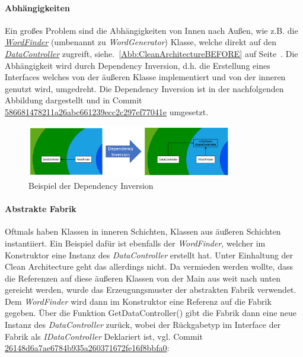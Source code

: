 \paragraph{Abhängigkeiten}
Ein großes Problem sind die Abhängigkeiten von Innen nach Außen, wie z.B. die \href{https://github.com/EinToni/Wortfinder/blob/main/Wortfinder/WordGenerator.cs}{\textit{WordFinder}} (umbenannt zu \textit{WordGenerator}) Klasse, welche direkt auf den \href{https://github.com/EinToni/Wortfinder/blob/586681478211a26abc661239ecc2c297ef77041e/Wortfinder/DataController.cs}{\textit{DataController}} zugreift, siehe.~\ref{Abb:CleanArchitectureBEFORE} auf Seite~\pageref{Abb:CleanArchitectureBEFORE}. Die Abhängigkeit wird durch Dependency Inversion, d.h. die Erstellung eines Interfaces welches von der äußeren Klasse implementiert und von der inneren genutzt wird, umgedreht. Die Dependency Inversion ist in der nachfolgenden Abbildung dargestellt und in Commit \href{https://github.com/EinToni/Wortfinder/commit/586681478211a26abc661239ecc2c297ef77041e}{586681478211a26abc661239ecc2c297ef77041e} umgesetzt.
\newpage
\begin{figure}[!ht]
  \centering
  \includegraphics[width=0.8\textwidth]{Bilder/DependencyInversion.PNG}
  \caption{Beispiel der Dependency Inversion}
  \label{Abb:DependencyInversion}
\end{figure}

\paragraph{Abstrakte Fabrik}
Oftmals haben Klassen in inneren Schichten, Klassen aus äußeren Schichten instantiiert. Ein Beispiel dafür ist ebenfalls der  \textit{WordFinder}, welcher im Konstruktor eine Instanz des \textit{DataController} erstellt hat. Unter Einhaltung der Clean Architecture geht das allerdings nicht. Da vermieden werden wollte, dass die Referenzen auf diese äußeren Klassen von der Main aus weit \glqq nach unten gereicht\grqq{} werden, wurde das Erzeugungsmuster der abstrakten Fabrik verwendet. Dem \textit{WordFinder} wird dann im Konstruktor eine Referenz auf die Fabrik gegeben. Über die Funktion \glqq GetDataController()\grqq{} gibt die Fabrik dann eine neue Instanz des \textit{DataController} zurück, wobei der Rückgabetyp im Interface der Fabrik als \textit{IDataController} Deklariert ist, vgl. Commit \href{https://github.com/EinToni/Wortfinder/commit/26148d6a7ae6784b935a260371672fe16f8bbfa0}{26148d6a7ae6784b935a260371672fe16f8bbfa0}:

